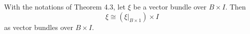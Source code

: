 With the notations of Theorem 4.3, let $\xi$ be a vector bundle over $B \times I$. Then
$$\xi \cong (\xi|_{B \times 1}) \times I$$
as vector bundles over $B \times I$.

